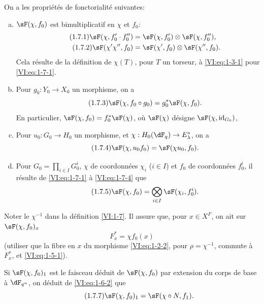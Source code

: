 On a les propriétés de fonctorialité suivantes:
\begin{enumerate}[a)]
  \item $\sF(\chi,f_0)$ est bimultiplicatif en $\chi$ et $f_0$: 
    \begin{align*}\tag{1.7.1}\label{VI:eq:1-7-1}
      \sF(\chi,f_0'\cdot f_0'') &= \sF(\chi,f_0')\otimes \sF(\chi,f_0'') \text{,} \\
      \tag{1.7.2}\label{VI:eq:1-7-2}
      \sF(\chi'\chi'',f_0) &= \sF(\chi',f_0)\otimes \sF(\chi'',f_0) \text{.}
    \end{align*}
Cela résulte de la définition de $\chi(T)$, pour $T$ un torseur,  
    à \eqref{VI:eq:1-3-1} pour \eqref{VI:eq:1-7-1}. 
  \item Pour $g_0:Y_0\to X_0$ un morphisme, on a 
    \begin{equation*}\tag{1.7.3}\label{VI:eq:1-7-3}
      \sF(\chi,f_0\circ g_0) = g_0^\ast \sF(\chi,f_0) \text{.}
    \end{equation*}
    En particulier, $\sF(\chi,f_0) = f_0^\ast \sF(\chi)$, où $\sF(\chi)$ 
    désigne $\sF(\chi,\operatorname{id}_{G_0})$, 
  \item Pour $u_0:G_0\to H_0$ un morphisme, et 
    $\chi:H_0(\dF_q) \to E_\lambda^\ast$, on a 
    \begin{equation*}\tag{1.7.4}\label{VI:eq:1-7-4}
      \sF(\chi,u_0 f_0) = \sF(\chi u_0,f_0) \text{.}
    \end{equation*}
  \item Pour $G_0=\prod_{i\in I} G_0^i$, $\chi$ de coordonnées $\chi_i$ 
    ($i\in I$) et $f_0$ de coordonnées $f_0^i$, il résulte de 
    \eqref{VI:eq:1-7-1} à \eqref{VI:eq:1-7-4} que 
    \begin{equation*}\tag{1.7.5}\label{VI:eq:1-7-5}
      \sF(\chi,f_0) = \bigotimes_{i\in I} \sF(\chi_i,f_0^i) \text{.}
    \end{equation*}    
\end{enumerate}

Noter le $\chi^{-1}$ dans la définition \ref{VI:1-7}. Il assure que, pour 
$x\in X^F$, on ait sur $\sF(\chi,f_0)_x$ 
\begin{equation*}\tag{1.7.6}\label{VI:eq:1-7-6}
  F_x^\ast = \chi f_0(x)
\end{equation*}
(utiliser que la fibre en $x$ du morphisme \eqref{VI:eq:1-2-2}, pour 
$\rho=\chi^{-1}$, commute à $F_x^\ast$, et \eqref{VI:eq:1-5-1}). 

Si $\sF(\chi,f_0)_1$ est le faisceau déduit de $\sF(\chi,f_0)$ par extension 
du corps de base à $\dF_{q^n}$, on déduit de \eqref{VI:eq:1-6-2} que 
\begin{equation*}\tag{1.7.7}\label{VI:eq:1-7-7}
  \sF(\chi,f_0)_1 = \sF(\chi\circ N,f_1) \text{.}
\end{equation*}





